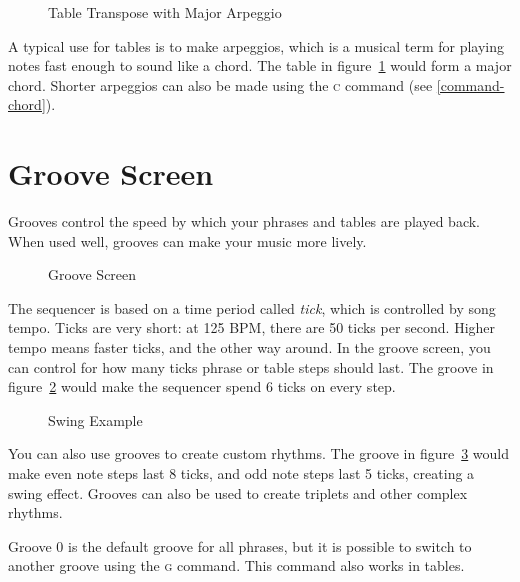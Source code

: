 \begin{figure}[htpb]
	\begin{center}
	\end{center}
	\caption{Table Transpose with Major Arpeggio}
	\label{fig:table-arp}
\end{figure}

A typical use for tables is to make arpeggios, which is a musical term for playing notes fast enough to sound like a chord. The table in figure~\ref{fig:table-arp} would form a major chord. Shorter arpeggios can also be made using the \textsc{c} command (see \ref{command-chord}).

\section{Groove Screen}

Grooves control the speed by which your phrases and tables are played back. When used well, grooves can make your music more lively.

\begin{figure}[htbp]
	\begin{center}
	\end{center}
	\caption{Groove Screen}
	\label{fig:groove}
\end{figure}

The sequencer is based on a time period called \emph{tick}, which is controlled by song tempo.
Ticks are very short: at 125 BPM, there are 50 ticks per second.
Higher tempo means faster ticks, and the other way around. 
In the groove screen, you can control for how many ticks phrase or table steps should last.
The groove in figure~\ref{fig:groove} would make the sequencer spend 6 ticks on every step.

\begin{figure}[htbp]
	\begin{center}
	\end{center}
	\caption{Swing Example}
	\label{fig:groove-swing}
\end{figure}

You can also use grooves to create custom rhythms. The groove in figure~\ref{fig:groove-swing} would make even note steps last 8 ticks, and odd note steps last 5 ticks, creating a swing effect. Grooves can also be used to create triplets and other complex rhythms.

Groove 0 is the default groove for all phrases, but it is possible to switch to another groove using the \textsc{g} command.
This command also works in tables.

